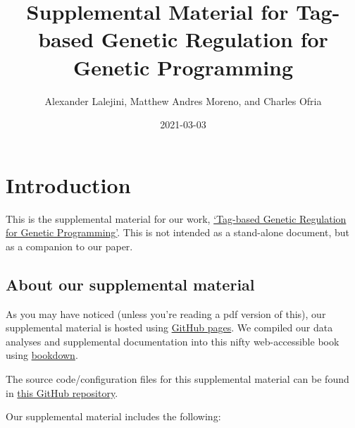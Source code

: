 \documentclass[
]{book}
\title{Supplemental Material for Tag-based Genetic Regulation for Genetic Programming}
\author{Alexander Lalejini, Matthew Andres Moreno, and Charles Ofria}
\date{2021-03-03}
\begin{document}
\maketitle

{
\setcounter{tocdepth}{1}
\tableofcontents
}
\hypertarget{introduction}{%
\chapter{Introduction}\label{introduction}}

This is the supplemental material for our work, \href{https://arxiv.org/abs/2012.09229}{`Tag-based Genetic Regulation for Genetic Programming'}.
This is not intended as a stand-alone document, but as a companion to our paper.

\hypertarget{about-our-supplemental-material}{%
\section{About our supplemental material}\label{about-our-supplemental-material}}

As you may have noticed (unless you're reading a pdf version of this), our supplemental material is hosted using \href{https://pages.github.com/}{GitHub pages}.
We compiled our data analyses and supplemental documentation into this nifty web-accessible book using \href{https://bookdown.org}{bookdown}.

The source code/configuration files for this supplemental material can be found in \href{https://github.com/amlalejini/Tag-based-Genetic-Regulation-for-LinearGP}{this GitHub repository}.

Our supplemental material includes the following:
\end{document}
